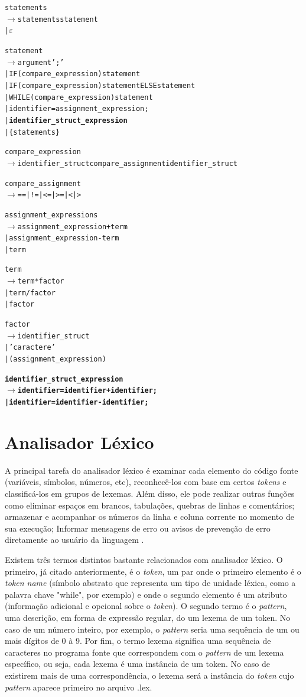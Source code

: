 \documentclass[12pt]{article}
\begin{document}
\begin{alltt}{\footnotesize

statements
   \(\to\) statements statement
   | \(\varepsilon\)

statement
   \(\to\) argument ';'
    | IF ( compare\_expression ) {\color{red}statement}
    | IF ( compare\_expression ) {\color{red}statement} ELSE {\color{red}statement}
    | WHILE ( compare\_expression ) {\color{red}statement}
    | identifier = {\color{red}assignment\_expression} ;
    | \textbf{identifier\_struct\_expression}
    | \{ statements \}
    
compare\_expression
   \(\to\) identifier\_struct compare\_assignment identifier\_struct
    
compare\_assignment
   \(\to\) == | != | <= | >= | {\color{red}<} | {\color{red}>}

assignment\_expressions
   \(\to\) assignment\_expression + term
    | assignment\_expression - term
    | term
    
term
   \(\to\) term * factor
    | term / factor
    | factor
    
factor
   \(\to\) identifier\_struct
    | {\color{red}' caractere '}
    | ( assignment\_expression )
    
\textbf{
identifier\_struct\_expression
   \(\to\) identifier = identifier + identifier ;
    | identifier = identifier - identifier ;
}		
}\end{alltt}

\section{Analisador Léxico}

\indent A principal tarefa do analisador léxico é examinar cada elemento do código fonte (variáveis, símbolos, números, etc), reconhecê-los com base em certos \textit{tokens} e classificá-los em grupos de lexemas. Além disso, ele pode realizar outras funções como eliminar espaços em brancos, tabulações, quebras de linhas e comentários; armazenar e acompanhar os números da linha e  coluna corrente no momento de sua execução; Informar mensagens de erro ou avisos de prevenção de erro diretamente ao usuário da linguagem \cite{book}.

\indent Existem três termos distintos bastante relacionados com analisador léxico. O primeiro, já citado anteriormente, é o \textit{token}, um par onde o primeiro elemento é o \textit{token name} (símbolo abstrato que representa um tipo de unidade léxica, como a palavra chave "while", por exemplo) e onde o segundo elemento é um atributo (informação adicional e opcional sobre o \textit{token}). O segundo termo é o \textit{pattern}, uma descrição, em forma de expressão regular, do um lexema de um token. No caso de um número inteiro, por exemplo, o \textit{pattern} seria uma sequência de um ou mais dígitos de 0 à 9. Por fim, o termo lexema significa uma sequência de caracteres no programa fonte que correspondem com o \textit{pattern} de um lexema específico, ou seja, cada lexema é uma instância de um token. No caso de existirem mais de uma correspondência, o lexema será a instância do \textit{token} cujo \textit{pattern} aparece primeiro no arquivo .lex.
\end{document}
